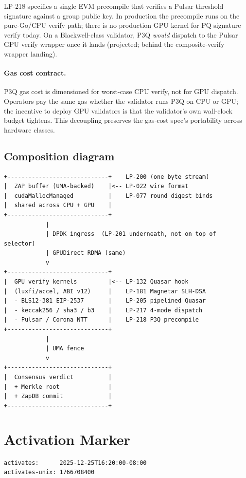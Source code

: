 LP-218 \cite{lp218} specifies a single EVM
precompile that verifies a Pulsar threshold signature against a
group public key. In production the precompile runs on the
pure-Go/CPU verify path; there is no production GPU kernel for PQ
signature verify today. On a Blackwell-class validator, P3Q
\emph{would} dispatch to the Pulsar GPU verify wrapper once it lands
(projected; behind the composite-verify wrapper landing).

\paragraph{Gas cost contract.} P3Q gas cost is dimensioned for
worst-case CPU verify, not for GPU dispatch. Operators pay the
same gas whether the validator runs P3Q on CPU or GPU; the
incentive to deploy GPU validators is that the validator's
own wall-clock budget tightens. This decoupling preserves the
gas-cost spec's portability across hardware classes.

\subsection{Composition diagram}

\begin{verbatim}
+-----------------------------+    LP-200 (one byte stream)
|  ZAP buffer (UMA-backed)    |<-- LP-022 wire format
|  cudaMallocManaged          |    LP-077 round digest binds
|  shared across CPU + GPU    |
+-----------------------------+
            |
            | DPDK ingress  (LP-201 underneath, not on top of selector)
            | GPUDirect RDMA (same)
            v
+-----------------------------+
|  GPU verify kernels         |<-- LP-132 Quasar hook
|  (luxfi/accel, ABI v12)     |    LP-181 Magnetar SLH-DSA
|  - BLS12-381 EIP-2537       |    LP-205 pipelined Quasar
|  - keccak256 / sha3 / b3    |    LP-217 4-mode dispatch
|  - Pulsar / Corona NTT      |    LP-218 P3Q precompile
+-----------------------------+
            |
            | UMA fence
            v
+-----------------------------+
|  Consensus verdict          |
|  + Merkle root              |
|  + ZapDB commit             |
+-----------------------------+
\end{verbatim}

\section{Activation Marker}

\begin{verbatim}
activates:      2025-12-25T16:20:00-08:00
activates-unix: 1766708400
\end{verbatim}

